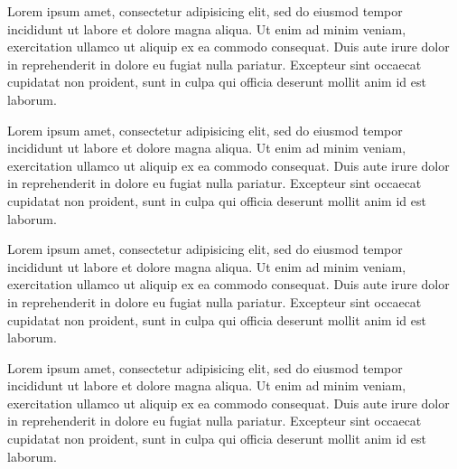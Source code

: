 \documentclass{article}
\begin{document}
\begin{multicols}{2}
Lorem ipsum  amet, consectetur adipisicing elit, sed
do eiusmod tempor incididunt ut labore et dolore magna aliqua. Ut enim
ad minim veniam,  exercitation ullamco
 ut aliquip ex ea commodo consequat. Duis aute
irure dolor in reprehenderit in 
dolore eu fugiat nulla pariatur. Excepteur sint occaecat cupidatat non
proident, sunt in culpa qui officia deserunt mollit anim id est laborum.

Lorem ipsum  amet, consectetur adipisicing elit, sed
do eiusmod tempor incididunt ut labore et dolore magna aliqua. Ut enim
ad minim veniam,  exercitation ullamco
 ut aliquip ex ea commodo consequat. Duis aute
irure dolor in reprehenderit in 
dolore eu fugiat nulla pariatur. Excepteur sint occaecat cupidatat non
proident, sunt in culpa qui officia deserunt mollit anim id est laborum.

Lorem ipsum  amet, consectetur adipisicing elit, sed
do eiusmod tempor incididunt ut labore et dolore magna aliqua. Ut enim
ad minim veniam,  exercitation ullamco
 ut aliquip ex ea commodo consequat. Duis aute
irure dolor in reprehenderit in 
dolore eu fugiat nulla pariatur. Excepteur sint occaecat cupidatat non
proident, sunt in culpa qui officia deserunt mollit anim id est laborum.

Lorem ipsum  amet, consectetur adipisicing elit, sed
do eiusmod tempor incididunt ut labore et dolore magna aliqua. Ut enim
ad minim veniam,  exercitation ullamco
 ut aliquip ex ea commodo consequat. Duis aute
irure dolor in reprehenderit in 
dolore eu fugiat nulla pariatur. Excepteur sint occaecat cupidatat non
proident, sunt in culpa qui officia deserunt mollit anim id est laborum.
\end{multicols}
\end{document}
